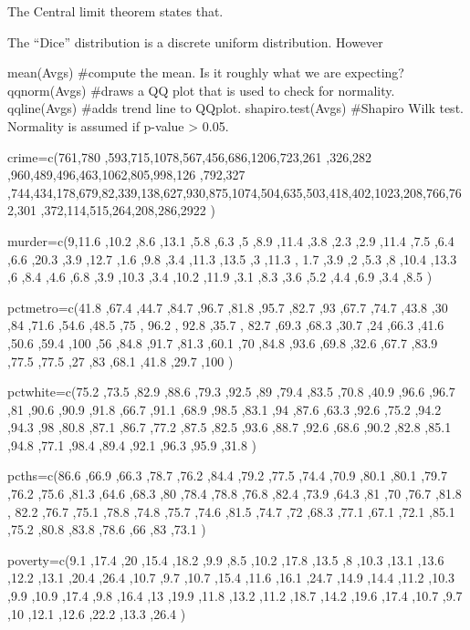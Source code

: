The Central limit theorem states that.

The “Dice” distribution is a discrete uniform distribution. However

mean(Avgs)                                #compute the mean. Is it roughly what we are expecting?
qqnorm(Avgs)                                #draws a QQ plot that is used to check for normality.
qqline(Avgs)                                #adds trend line to QQplot.
shapiro.test(Avgs)                       #Shapiro Wilk test. Normality is assumed if p-value > 0.05.
                                     


crime=c(761,780 ,593,715,1078,567,456,686,1206,723,261 ,326,282 ,960,489,496,463,1062,805,998,126 ,792,327 ,744,434,178,679,82,339,138,627,930,875,1074,504,635,503,418,402,1023,208,766,762,301 ,372,114,515,264,208,286,2922 )

murder=c(9,11.6 ,10.2 ,8.6 ,13.1 ,5.8 ,6.3 ,5 ,8.9 ,11.4 ,3.8 ,2.3 ,2.9 ,11.4 ,7.5 ,6.4 ,6.6 ,20.3 ,3.9 ,12.7 ,1.6 ,9.8 ,3.4 ,11.3 ,13.5 ,3 ,11.3 ,
1.7 ,3.9 ,2 ,5.3 ,8 ,10.4 ,13.3 ,6 ,8.4 ,4.6 ,6.8 ,3.9 ,10.3 ,3.4 ,10.2 ,11.9 ,3.1 ,8.3 ,3.6 ,5.2 ,4.4 ,6.9 ,3.4 ,8.5 )

pctmetro=c(41.8 ,67.4 ,44.7 ,84.7 ,96.7 ,81.8 ,95.7 ,82.7 ,93 ,67.7 ,74.7 ,43.8 ,30 ,84 ,71.6 ,54.6 ,48.5 ,75 , 96.2 , 92.8 ,35.7 ,
82.7 ,69.3 ,68.3 ,30.7 ,24 ,66.3 ,41.6 ,50.6 ,59.4 ,100 ,56 ,84.8 ,91.7 ,81.3 ,60.1 ,70 ,84.8 ,93.6 ,69.8 ,32.6 ,67.7 ,83.9 ,77.5 ,77.5 ,27 ,83 ,68.1 ,41.8 ,29.7 ,100 )

pctwhite=c(75.2 ,73.5 ,82.9 ,88.6 ,79.3 ,92.5 ,89 ,79.4 ,83.5 ,70.8 ,40.9 ,96.6 ,96.7 ,81 ,90.6 ,90.9 ,91.8 ,66.7 ,91.1 ,68.9 ,98.5 ,83.1 ,94 ,87.6 ,63.3 ,92.6 ,75.2 ,94.2 ,94.3 ,98 ,80.8 ,87.1 ,86.7 ,77.2 ,87.5 ,82.5 ,93.6 ,88.7 ,92.6 ,68.6 ,90.2 ,82.8 ,85.1 ,94.8 ,77.1 ,98.4 ,89.4 ,92.1 ,96.3 ,95.9 ,31.8 )

pcths=c(86.6 ,66.9 ,66.3 ,78.7 ,76.2 ,84.4 ,79.2 ,77.5 ,74.4 ,70.9 ,80.1 ,80.1 ,79.7 ,76.2 ,75.6 ,81.3 ,64.6 ,68.3 ,80 ,78.4 ,78.8 ,76.8 ,82.4 ,73.9 ,64.3 ,81 ,70 ,76.7 ,81.8 , 82.2 ,76.7 ,75.1 ,78.8 ,74.8 ,75.7 ,74.6 ,81.5 ,74.7 ,72 ,68.3 ,77.1 ,67.1 ,72.1 ,85.1 ,75.2 ,80.8 ,83.8 ,78.6 ,66 ,83 ,73.1 )

poverty=c(9.1 ,17.4 ,20 ,15.4 ,18.2 ,9.9 ,8.5 ,10.2 ,17.8 ,13.5 ,8 ,10.3 ,13.1 ,13.6 ,12.2 ,13.1 ,20.4 ,26.4 ,10.7 ,9.7 ,10.7 ,15.4 ,11.6 ,16.1 ,24.7 ,14.9 ,14.4 ,11.2 ,10.3 ,9.9 ,10.9 ,17.4 ,9.8 ,16.4 ,13 ,19.9 ,11.8 ,13.2 ,11.2 ,18.7 ,14.2 ,19.6 ,17.4 ,10.7 ,9.7 ,10 ,12.1 ,12.6 ,22.2 ,13.3 ,26.4 )




